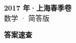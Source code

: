\documentclass[zihao=-4, a4paper]{ctexart}
\begin{document}
\begin{center}
  {\Large\bfseries 2017 年·上海春季卷}\\[4pt]
  {\large 数学 · 简答版}
\end{center}
\medskip
{}

\clearpage
{}
\begin{center}{\Large\bfseries 答案速查}\end{center}
\medskip

\end{document}
